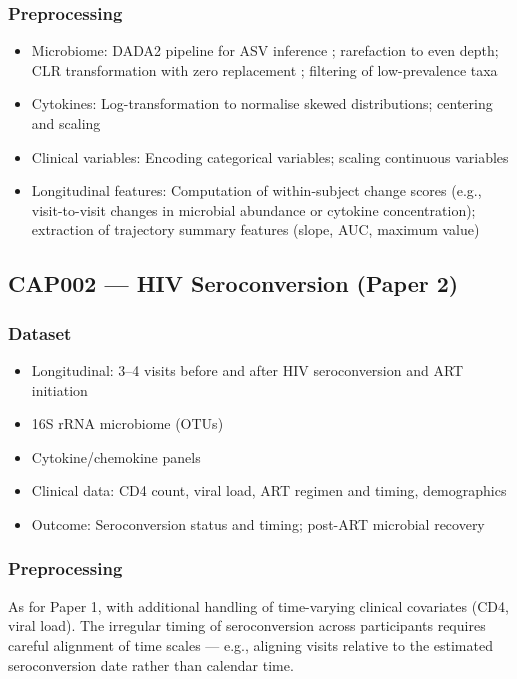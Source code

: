 \documentclass[12pt,a4paper]{report}
\begin{document}
\subsubsection{Preprocessing}
\begin{itemize}
    \item Microbiome: DADA2 pipeline for ASV inference \cite{callahan2016}; rarefaction to even depth; CLR transformation with zero replacement \cite{martin2012}; filtering of low-prevalence taxa
    \item Cytokines: Log-transformation to normalise skewed distributions; centering and scaling
    \item Clinical variables: Encoding categorical variables; scaling continuous variables
    \item Longitudinal features: Computation of within-subject change scores (e.g., visit-to-visit changes in microbial abundance or cytokine concentration); extraction of trajectory summary features (slope, AUC, maximum value)
\end{itemize}

\subsection{CAP002 --- HIV Seroconversion (Paper 2)}

\subsubsection{Dataset}
\begin{itemize}
    \item Longitudinal: 3--4 visits before and after HIV seroconversion and ART initiation
    \item 16S rRNA microbiome (OTUs)
    \item Cytokine/chemokine panels
    \item Clinical data: CD4 count, viral load, ART regimen and timing, demographics
    \item Outcome: Seroconversion status and timing; post-ART microbial recovery
\end{itemize}

\subsubsection{Preprocessing}
As for Paper 1, with additional handling of time-varying clinical covariates (CD4, viral load). The irregular timing of seroconversion across participants requires careful alignment of time scales --- e.g., aligning visits relative to the estimated seroconversion date rather than calendar time.
\end{document}
